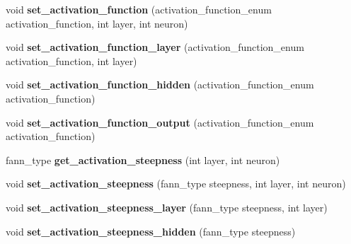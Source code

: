 \begin{DoxyCompactItemize}
\item 
\hypertarget{class_f_a_n_n_1_1neural__net_a35e7b0956b10c7fb5cdac171778f4faa}{void {\bfseries set\-\_\-activation\-\_\-function} (activation\-\_\-function\-\_\-enum activation\-\_\-function, int layer, int neuron)}\label{class_f_a_n_n_1_1neural__net_a35e7b0956b10c7fb5cdac171778f4faa}

\item 
\hypertarget{class_f_a_n_n_1_1neural__net_a0ddc64a87fd8791f1fdeaa642917c7b6}{void {\bfseries set\-\_\-activation\-\_\-function\-\_\-layer} (activation\-\_\-function\-\_\-enum activation\-\_\-function, int layer)}\label{class_f_a_n_n_1_1neural__net_a0ddc64a87fd8791f1fdeaa642917c7b6}

\item 
\hypertarget{class_f_a_n_n_1_1neural__net_a55cb24a8956b42326d81516c8575e1a9}{void {\bfseries set\-\_\-activation\-\_\-function\-\_\-hidden} (activation\-\_\-function\-\_\-enum activation\-\_\-function)}\label{class_f_a_n_n_1_1neural__net_a55cb24a8956b42326d81516c8575e1a9}

\item 
\hypertarget{class_f_a_n_n_1_1neural__net_a8e32847cb4ee1efc313a6df104685f82}{void {\bfseries set\-\_\-activation\-\_\-function\-\_\-output} (activation\-\_\-function\-\_\-enum activation\-\_\-function)}\label{class_f_a_n_n_1_1neural__net_a8e32847cb4ee1efc313a6df104685f82}

\item 
\hypertarget{class_f_a_n_n_1_1neural__net_ae41c0a1622ca080f1aa981a6e9f5c64c}{fann\-\_\-type {\bfseries get\-\_\-activation\-\_\-steepness} (int layer, int neuron)}\label{class_f_a_n_n_1_1neural__net_ae41c0a1622ca080f1aa981a6e9f5c64c}

\item 
\hypertarget{class_f_a_n_n_1_1neural__net_ac2c009c2496c27058a318a5d66c81233}{void {\bfseries set\-\_\-activation\-\_\-steepness} (fann\-\_\-type steepness, int layer, int neuron)}\label{class_f_a_n_n_1_1neural__net_ac2c009c2496c27058a318a5d66c81233}

\item 
\hypertarget{class_f_a_n_n_1_1neural__net_a8a7b75108f04e68e22af1ad16d01ee11}{void {\bfseries set\-\_\-activation\-\_\-steepness\-\_\-layer} (fann\-\_\-type steepness, int layer)}\label{class_f_a_n_n_1_1neural__net_a8a7b75108f04e68e22af1ad16d01ee11}

\item 
\hypertarget{class_f_a_n_n_1_1neural__net_aa76d2101794b00f3f9505fce0891f28c}{void {\bfseries set\-\_\-activation\-\_\-steepness\-\_\-hidden} (fann\-\_\-type steepness)}\label{class_f_a_n_n_1_1neural__net_aa76d2101794b00f3f9505fce0891f28c}


\end{DoxyCompactItemize}

